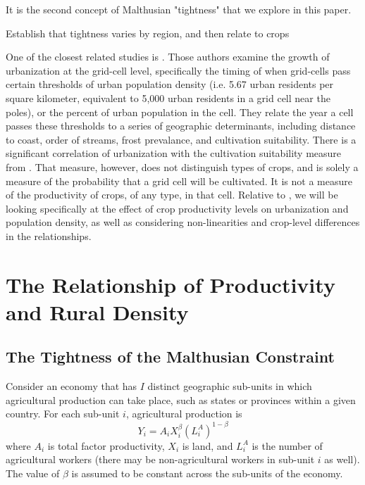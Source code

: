 \documentclass[10pt]{article}
\begin{document}
It is the second concept of Malthusian "tightness" that we explore in this paper. 

Establish that tightness varies by region, and then relate to crops


One of the closest related studies is \citet{mfm2014}. Those authors examine the growth of urbanization at the grid-cell level, specifically the timing of when grid-cells pass certain thresholds of urban population density (i.e. 5.67 urban residents per square kilometer, equivalent to 5,000 urban residents in a grid cell near the poles), or the percent of urban population in the cell. They relate the year a cell passes these thresholds to a series of geographic determinants, including distance to coast, order of streams, frost prevalance, and cultivation suitability. There is a significant correlation of urbanization with the cultivation suitability measure from \citet{ramankutty2002}. That measure, however, does not distinguish types of crops, and is solely a measure of the probability that a grid cell will be cultivated. It is not a measure of the productivity of crops, of any type, in that cell. Relative to \citet{mfm2014}, we will be looking specifically at the effect of crop productivity levels on urbanization and population density, as well as considering non-linearities and crop-level differences in the relationships.




\section{The Relationship of Productivity and Rural Density}



\subsection{The Tightness of the Malthusian Constraint}
Consider an economy that has $I$ distinct geographic sub-units in which agricultural production can take place, such as states or provinces within a given country. For each sub-unit $i$, agricultural production is
\begin{equation}
Y_{i} = A_{i} X_{i}^{\beta} (L^A_{i})^{1-\beta}
\end{equation}
where $A_{i}$ is total factor productivity, $X_{i}$ is land, and $L^A_{i}$ is the number of agricultural workers (there may be non-agricultural workers in sub-unit $i$ as well). The value of $\beta$ is assumed to be constant across the sub-units of the economy.
\end{document}
